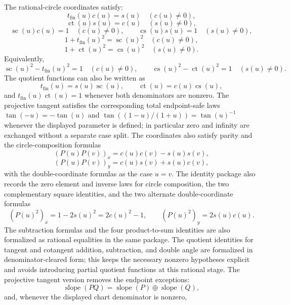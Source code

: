 \begin{theorem}
\leanok
The rational-circle coordinates satisfy:
\[
  t_{\mathrm{fin}}(u)c(u)=s(u)\quad(c(u)\ne0),
\]
\[
  \operatorname{ct}(u)s(u)=c(u)\quad(s(u)\ne0),
\]
\[
  \operatorname{sc}(u)c(u)=1\quad(c(u)\ne0),
  \qquad
  \operatorname{cs}(u)s(u)=1\quad(s(u)\ne0),
\]
\[
  1+t_{\mathrm{fin}}(u)^2=\operatorname{sc}(u)^2\quad(c(u)\ne0),
\]
\[
  1+\operatorname{ct}(u)^2=\operatorname{cs}(u)^2\quad(s(u)\ne0).
\]
Equivalently,
\[
  \operatorname{sc}(u)^2-t_{\mathrm{fin}}(u)^2=1\quad(c(u)\ne0),
  \qquad
  \operatorname{cs}(u)^2-\operatorname{ct}(u)^2=1\quad(s(u)\ne0).
\]
The quotient functions can also be written as
\[
  t_{\mathrm{fin}}(u)=s(u)\operatorname{sc}(u),
  \qquad
  \operatorname{ct}(u)=c(u)\operatorname{cs}(u),
\]
and \(t_{\mathrm{fin}}(u)\operatorname{ct}(u)=1\) whenever both denominators
are nonzero.  The projective tangent satisfies the corresponding total
endpoint-safe laws \(\tan(-u)=-\tan(u)\) and
\(\tan((1-u)/(1+u))=\tan(u)^{-1}\) whenever the displayed parameter is
defined; in particular zero and infinity are exchanged without a separate
case split.  The coordinates also satisfy parity and the circle-composition formulas
\[
  (P(u)P(v))_x=c(u)c(v)-s(u)s(v),
\]
\[
  (P(u)P(v))_y=c(u)s(v)+s(u)c(v),
\]
with the double-coordinate formulas as the case \(u=v\).
The identity package also records the zero element and inverse laws for
circle composition, the two complementary square identities, and the two
alternate double-coordinate formulas
\[
  (P(u)^2)_x=1-2s(u)^2=2c(u)^2-1,
  \qquad
  (P(u)^2)_y=2s(u)c(u).
\]
The subtraction formulas and the four product-to-sum identities are also
formalized as rational equalities in the same package.
The quotient identities for tangent and cotangent addition, subtraction, and
double angle are formalized in denominator-cleared form; this keeps the
necessary nonzero hypotheses explicit and avoids introducing partial quotient
functions at this rational stage.  The projective tangent version removes the
endpoint exceptions:
\[
  \operatorname{slope}(PQ)=\operatorname{slope}(P)\oplus
  \operatorname{slope}(Q),
\]
and, whenever the displayed chart denominator is nonzero,

\end{theorem}
